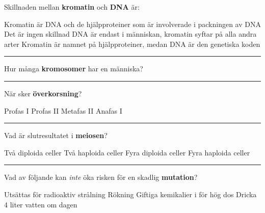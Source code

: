 \documentclass{exam}
\begin{document}
\vspace{5mm} %
\begin{center}
\end{center}
\vspace{5mm} %

\begin{questions}

\question Skillnaden mellan \textbf{kromatin} och \textbf{DNA} är:
\begin{checkboxes}
   \choice Kromatin är DNA och de hjälpproteiner som är involverade i packningen av DNA
   \choice Det är ingen skillnad
   \choice DNA är endast i människan, kromatin syftar på alla andra arter
   \choice Kromatin är namnet på hjälpproteiner, medan DNA är den genetiska koden
\end{checkboxes} 

\vspace{5mm} %
\hrule 
\vspace{5mm} %

\question Hur många \textbf{kromosomer} har en människa?
\begin{checkboxes}
\end{checkboxes} 



\vspace{5mm} %
\hrule 
\vspace{5mm} %
\question När sker \textbf{överkorsning}?
\begin{checkboxes}
   \choice Profas I
   \choice Profas II
   \choice Metafas II
   \choice Anafas I
\end{checkboxes}

\vspace{5mm} %
\hrule 
\vspace{5mm} %
\question Vad är slutresultatet i \textbf{meiosen}? 
\begin{checkboxes}
   \choice Två diploida celler
   \choice Två haploida celler
   \choice Fyra diploida celler
   \choice Fyra haploida celler
\end{checkboxes}

\vspace{5mm} %
\hrule 
\vspace{5mm} %
\question Vad av följande kan \textit{inte} öka risken för en skadlig \textbf{mutation}?
\begin{checkboxes}
   \choice Utsättas för radioaktiv strålning
   \choice Rökning
   \choice Giftiga kemikalier i för hög dos
   \choice Dricka 4 liter vatten om dagen
\end{checkboxes}
\break


\end{questions}
\end{document}
